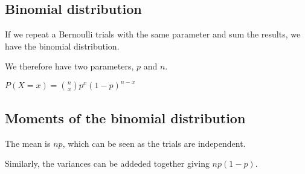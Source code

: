 
\subsection{Binomial distribution}

If we repeat a Bernoulli trials with the same parameter and sum the results, we have the binomial distribution.

We therefore have two parameters, \(p\) and \(n\).

\(P(X=x)=\binom{n}{x}p^x(1-p)^{n-x}\)

\subsection{Moments of the binomial distribution}

The mean is \(np\), which can be seen as the trials are independent.

Similarly, the variances can be addeded together giving \(np(1-p)\).

